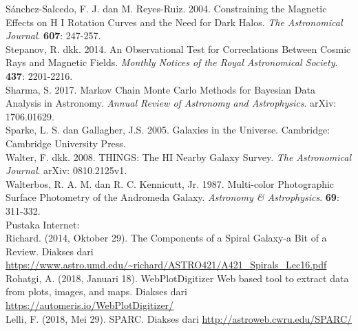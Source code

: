 \begin{thebibliography}{}
S\'anchez-Salcedo, F. J. dan M. Reyes-Ruiz. 2004. Constraining the Magnetic Effects on H I Rotation Curves and the Need for Dark Halos. \textit{The Astronomical Journal}. \textbf{607}: 247-257. \\

Stepanov, R. dkk. 2014. An Observational Test for Correclations Between Cosmic Rays and Magnetic Fields. \textit{Monthly Notices of the Royal Astronomical Society}. \textbf{437}: 2201-2216. \\

Sharma, S. 2017. Markov Chain Monte Carlo Methods for Bayesian Data Analysis in Astronomy. \textit{Annual Review of Astronomy and Astrophysics}. arXiv: 1706.01629.\\

Sparke, L. S. dan Gallagher, J.S. 2005. Galaxies in the Universe. Cambridge: Cambridge University Press.   \\

Walter, F. dkk.  2008. THINGS: The HI Nearby Galaxy Survey. \textit{The Astronomical Journal}. arXiv: 0810.2125v1. \\

Walterbos, R. A. M. dan R. C. Kennicutt, Jr. 1987. Multi-color Photographic Surface Photometry of the Andromeda Galaxy. \textit{Astronomy & Astrophysics}. \textbf{69}: 311-332.\\

Pustaka Internet:\\

Richard. (2014, Oktober 29). The Components of a Spiral Galaxy-a Bit of a Review. Diakses dari \url{https://www.astro.umd.edu/~richard/ASTRO421/A421_Spirals_Lec16.pdf}\\

Rohatgi, A. (2018, Januari 18). WebPlotDigitizer Web based tool to extract data from plots, images, and maps. Diakses dari \url{https://automeris.io/WebPlotDigitizer/}\\

Lelli, F. (2018, Mei 29). SPARC. Diakses dari \url{http://astroweb.cwru.edu/SPARC/}\\
\end{thebibliography}